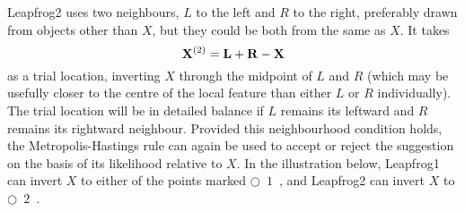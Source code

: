 Leapfrog2 uses two neighbours, $L$ to the left and $R$ to the right, preferably drawn from objects other than $X$, but they could be both from the same as $X$.
It takes
$$
   {\bf X}^{(2)} = {\bf L} + {\bf R} - {\bf X}
$$
as a trial location, inverting $X$ through the midpoint of $L$ and $R$ 
(which may be usefully closer to the centre of the local feature than either $L$ or $R$ individually).
The trial location will be in detailed balance if $L$ remains its leftward and $R$ remains its rightward neighbour.
Provided this neighbourhood condition holds, 
the Metropolis-Hastings rule can again be used to accept or reject the suggestion on the basis of its likelihood relative to $X$.
In the illustration below, Leapfrog1 can invert $X$ to either of the points marked \hbox{$\bigcirc$ \hskip -10.2pt ${\scriptstyle 1}$ \hskip 3pt},
and Leapfrog2 can invert $X$ to \hbox{$\bigcirc$ \hskip -10.2pt ${\scriptstyle 2}$ \hskip 3pt}.
